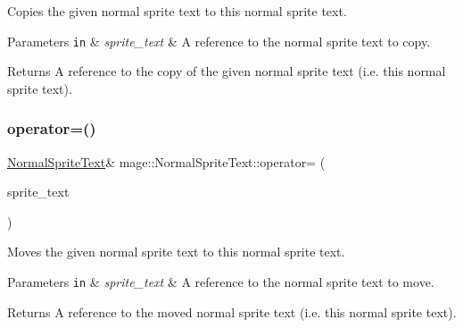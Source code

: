 Copies the given normal sprite text to this normal sprite text.


\begin{DoxyParams}[1]{Parameters}
\mbox{\tt in}  & {\em sprite\+\_\+text} & A reference to the normal sprite text to copy. \\
\hline
\end{DoxyParams}
\begin{DoxyReturn}{Returns}
A reference to the copy of the given normal sprite text (i.\+e. this normal sprite text). 
\end{DoxyReturn}
\hypertarget{classmage_1_1_normal_sprite_text_a54cb023fad3b66dba35854ceaa50bc44}{}\label{classmage_1_1_normal_sprite_text_a54cb023fad3b66dba35854ceaa50bc44} 
\subsubsection{\texorpdfstring{operator=()}{operator=()}\hspace{0.1cm}{\footnotesize\ttfamily [2/2]}}
{\footnotesize\ttfamily \hyperlink{classmage_1_1_normal_sprite_text}{Normal\+Sprite\+Text}\& mage\+::\+Normal\+Sprite\+Text\+::operator= (\begin{DoxyParamCaption}\item[{\hyperlink{classmage_1_1_normal_sprite_text}{Normal\+Sprite\+Text} \&\&}]{sprite\+\_\+text }\end{DoxyParamCaption})\hspace{0.3cm}{\ttfamily [delete]}}

Moves the given normal sprite text to this normal sprite text.


\begin{DoxyParams}[1]{Parameters}
\mbox{\tt in}  & {\em sprite\+\_\+text} & A reference to the normal sprite text to move. \\
\hline
\end{DoxyParams}
\begin{DoxyReturn}{Returns}
A reference to the moved normal sprite text (i.\+e. this normal sprite text). 
\end{DoxyReturn}
